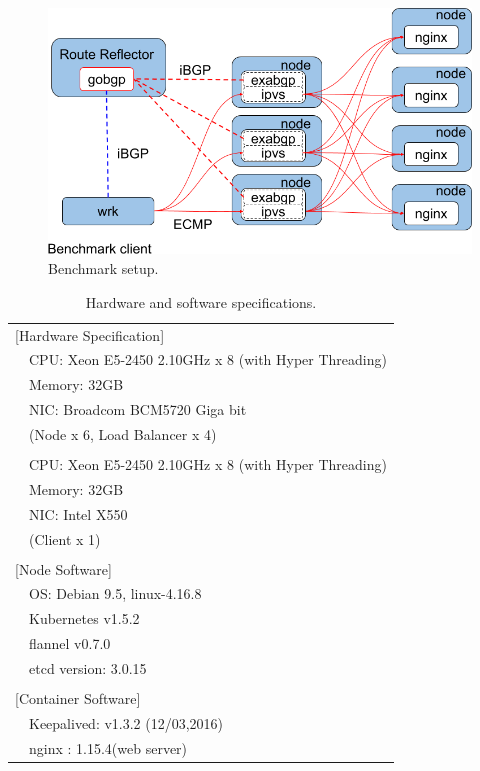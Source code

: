 \begin{figure}[h]
  \centering
  \includegraphics[width=0.8\columnwidth]{Figs/lb_ecmp_schem}

  \par\bigskip
  \centering
  \begin{minipage}{0.8\columnwidth}
    \caption[Benchmark setup]{Benchmark setup.}
    \label{fig:ecmp-benchmark-schem}
  \end{minipage}
\end{figure}

{
\setlength{\tabcolsep}{1em}
\renewcommand{\arraystretch}{1.2}

\begin{table}[h]
  \centering
  \begin{tabular}{ll}
    \hline 
    \multicolumn{2}{l}{[Hardware Specification]}   \\
    & CPU: Xeon E5-2450 2.10GHz x 8 (with Hyper Threading) \\
    & Memory: 32GB \\
    & NIC: Broadcom BCM5720 Giga bit \\
    & (Node x 6, Load Balancer x 4) \\
    & \\
    & CPU: Xeon E5-2450 2.10GHz x 8 (with Hyper Threading) \\
    & Memory: 32GB \\
    & NIC: Intel X550 \\
    & (Client x 1) \\
    & \\
    \multicolumn{2}{l}{[Node Software]}  \\
    & OS: Debian 9.5, linux-4.16.8 \\
    & Kubernetes v1.5.2 \\
    & flannel v0.7.0 \\
    & etcd version: 3.0.15 \\
    & \\
    \multicolumn{2}{l}{[Container Software]}   \\
    & Keepalived: v1.3.2 (12/03,2016) \\
    & nginx : 1.15.4(web server) \\
  \hline 
  \end{tabular}
  \par\bigskip
  \caption{Hardware and software specifications.}
  \label{tab:ecmp-hw_sw_spec}
\end{table}
}


